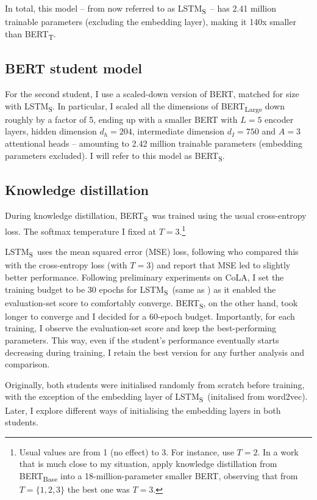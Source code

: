 \documentclass[bsc,frontabs,twoside,singlespacing,parskip,deptreport]{infthesis}
\def\BERTT{BERT\textsubscript{T}}
\def\BERTS{BERT\textsubscript{S}}
\def\LSTMS{LSTM\textsubscript{S}}
\begin{document}
{{{      In total, this model -- from now referred to as \LSTMS~-- has 2.41 million trainable parameters (excluding the embedding layer), making it 140x smaller than \BERTT.
    }

    \subsection{BERT student model}{
      For the second student, I use a scaled-down version of BERT, matched for size with \LSTMS. In particular, I scaled all the dimensions of BERT\textsubscript{Large} down roughly by a factor of 5, ending up with a smaller BERT with $L=5$ encoder layers, hidden dimension $d_h=204$, intermediate dimension $d_I=750$ and $A=3$ attentional heads -- amounting to 2.42 million trainable parameters (embedding parameters excluded). I will refer to this model as \BERTS.
    }

    \subsection{Knowledge distillation}{
      During knowledge distillation, \BERTS~was trained using the usual cross-entropy loss. The softmax temperature I fixed at $T=3$.\footnote{Usual values are from 1 (no effect) to 3. For instance, \citet{Sanh_2019} use $T=2$. In a work that is much close to my situation, \citet{Tsai_2019} apply knowledge distillation from BERT\textsubscript{Base} into a 18-million-parameter smaller BERT, observing that from $T=\{1, 2, 3\}$ the best one was $T=3$.}
      
      \LSTMS~uses the mean squared error (MSE) loss, following \citeauthor{Tang_2019b} who compared this with the cross-entropy loss (with $T=3$) and report that MSE led to slightly better performance. Following preliminary experiments on CoLA, I set the training budget to be 30 epochs for \LSTMS~(same as \citeauthor{Tang_2019b}) as it enabled the evaluation-set score to comfortably converge. \BERTS, on the other hand, took longer to converge and I decided for a 60-epoch budget. Importantly, for each training, I observe the evaluation-set score and keep the best-performing parameters. This way, even if the student's performance eventually starts decreasing during training, I retain the best version for any further analysis and comparison.

      Originally, both students were initialised randomly from scratch before training, with the exception of the embedding layer of \LSTMS~(initalised from word2vec). Later, I explore different ways of initialising the embedding layers in both students.

}}}
\end{document}
